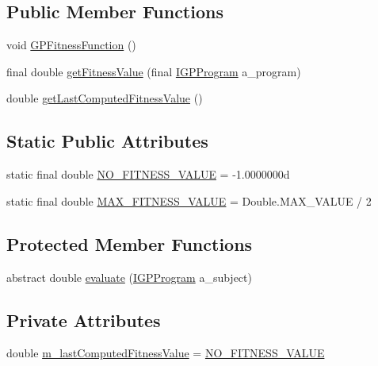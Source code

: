 \subsection*{Public Member Functions}
\begin{DoxyCompactItemize}
\item 
void \hyperlink{classorg_1_1jgap_1_1gp_1_1_g_p_fitness_function_a4fdc1c998282659ffaa3b0119a9067cc}{G\-P\-Fitness\-Function} ()
\item 
final double \hyperlink{classorg_1_1jgap_1_1gp_1_1_g_p_fitness_function_a3aa29634fa5b8eff5883664acec0638f}{get\-Fitness\-Value} (final \hyperlink{interfaceorg_1_1jgap_1_1gp_1_1_i_g_p_program}{I\-G\-P\-Program} a\-\_\-program)
\item 
double \hyperlink{classorg_1_1jgap_1_1gp_1_1_g_p_fitness_function_a7e5f568f9295e653a895b588315f67cc}{get\-Last\-Computed\-Fitness\-Value} ()
\end{DoxyCompactItemize}
\subsection*{Static Public Attributes}
\begin{DoxyCompactItemize}
\item 
static final double \hyperlink{classorg_1_1jgap_1_1gp_1_1_g_p_fitness_function_a1044d8e90c0a44f22c74088af71a931f}{N\-O\-\_\-\-F\-I\-T\-N\-E\-S\-S\-\_\-\-V\-A\-L\-U\-E} = -\/1.\-0000000d
\item 
static final double \hyperlink{classorg_1_1jgap_1_1gp_1_1_g_p_fitness_function_a19cb0f67653683bec271ae48fcd9cfb6}{M\-A\-X\-\_\-\-F\-I\-T\-N\-E\-S\-S\-\_\-\-V\-A\-L\-U\-E} = Double.\-M\-A\-X\-\_\-\-V\-A\-L\-U\-E / 2
\end{DoxyCompactItemize}
\subsection*{Protected Member Functions}
\begin{DoxyCompactItemize}
\item 
abstract double \hyperlink{classorg_1_1jgap_1_1gp_1_1_g_p_fitness_function_a1270a9630153695d79cb9b78b4dfc24e}{evaluate} (\hyperlink{interfaceorg_1_1jgap_1_1gp_1_1_i_g_p_program}{I\-G\-P\-Program} a\-\_\-subject)
\end{DoxyCompactItemize}
\subsection*{Private Attributes}
\begin{DoxyCompactItemize}
\item 
double \hyperlink{classorg_1_1jgap_1_1gp_1_1_g_p_fitness_function_a54c8de1552f152db9565ea5ec43a625e}{m\-\_\-last\-Computed\-Fitness\-Value} = \hyperlink{classorg_1_1jgap_1_1gp_1_1_g_p_fitness_function_a1044d8e90c0a44f22c74088af71a931f}{N\-O\-\_\-\-F\-I\-T\-N\-E\-S\-S\-\_\-\-V\-A\-L\-U\-E}
\end{DoxyCompactItemize}
